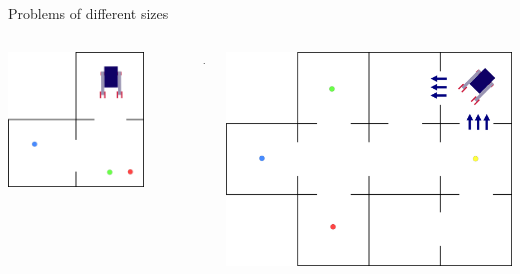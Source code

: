\begin{frame}[c, fragile]{Problems of different sizes}
    \begin{columns}[c]
        \begin{column}[c]{0.3\textwidth}
            \includegraphics[width = 0.8\textwidth]{images/3_rooms/gd_3_0.png}
        \end{column}
        \begin{column}{0.1\textwidth}
            \centering $\rightarrow$
        \end{column}
        \begin{column}[c]{0.5\textwidth}
            \includegraphics[width = \textwidth, angle=90]{images/11_rooms/gd_11_0.png}
        \end{column}
    \end{columns}
\end{frame}
